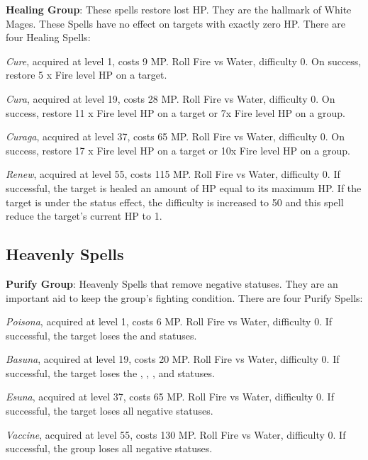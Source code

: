\begin{multicols}{2}
	
    \textbf{Healing Group}: These spells restore lost HP\@. They are the hallmark of White Mages. These Spells have no effect on targets with exactly zero HP\@. There are four Healing Spells:

    \textit{Cure}, acquired at level 1, costs 9 MP\@. Roll Fire vs Water, difficulty 0. On success, restore 5 x Fire level HP on a target.

    \textit{Cura}, acquired at level 19, costs 28 MP\@. Roll Fire vs Water, difficulty 0. On success, restore 11 x Fire level HP on a target or 7x Fire level HP on a group.

    \textit{Curaga}, acquired at level 37, costs 65 MP\@. Roll Fire vs Water, difficulty 0. On success, restore 17 x Fire level HP on a target or 10x Fire level HP on a group.

    \textit{Renew}, acquired at level 55, costs 115 MP\@. Roll Fire vs Water, difficulty 0. If successful, the target is healed an amount of HP equal to its maximum HP\@. If the target is under the  status effect, the difficulty is increased to 50 and this spell reduce the target’s current HP to 1.

    \subsection{Heavenly Spells}\label{subsec:white-heavenly}

    \textbf{Purify Group}: Heavenly Spells that remove negative statuses. They are an important aid to keep the group’s fighting condition. There are four Purify Spells:

    \textit{Poisona}, acquired at level 1, costs 6 MP\@. Roll Fire vs Water, difficulty 0. If successful, the target loses the  and  statuses.

    \textit{Basuna}, acquired at level 19, costs 20 MP\@. Roll Fire vs Water, difficulty 0. If successful, the target loses the , , ,  and  statuses.

    \textit{Esuna}, acquired at level 37, costs 65 MP\@. Roll Fire vs Water, difficulty 0. If successful, the target loses all negative statuses.

    \textit{Vaccine}, acquired at level 55, costs 130 MP\@. Roll Fire vs Water, difficulty 0. If successful, the group loses all negative statuses.


\end{multicols}
